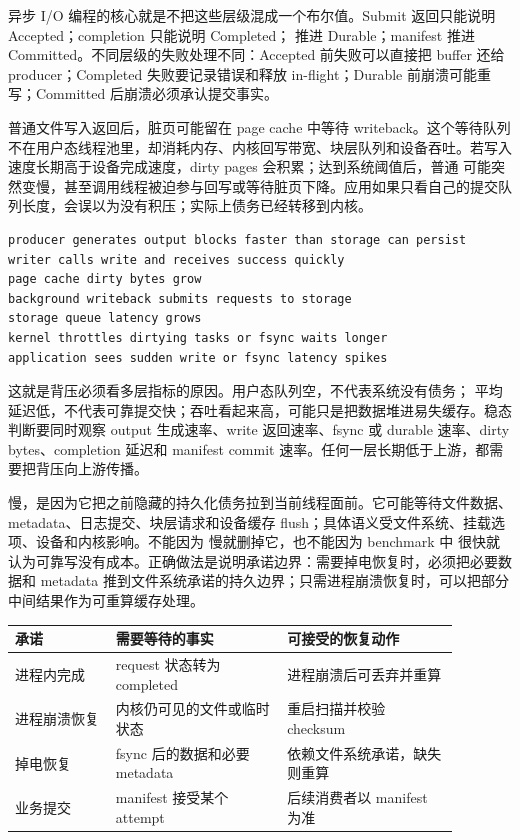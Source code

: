 异步 I/O 编程的核心就是不把这些层级混成一个布尔值。Submit 返回只能说明 Accepted；completion 只能说明 Completed； 推进 Durable；manifest 推进 Committed。不同层级的失败处理不同：Accepted 前失败可以直接把 buffer 还给 producer；Completed 失败要记录错误和释放 in-flight；Durable 前崩溃可能重写；Committed 后崩溃必须承认提交事实。

普通文件写入返回后，脏页可能留在 page cache 中等待 writeback。这个等待队列不在用户态线程池里，却消耗内存、内核回写带宽、块层队列和设备吞吐。若写入速度长期高于设备完成速度，dirty pages 会积累；达到系统阈值后，普通  可能突然变慢，甚至调用线程被迫参与回写或等待脏页下降。应用如果只看自己的提交队列长度，会误以为没有积压；实际上债务已经转移到内核。

\begin{lstlisting}[numbers=none,caption={写入债务从用户态转移到内核的过程}]
producer generates output blocks faster than storage can persist
writer calls write and receives success quickly
page cache dirty bytes grow
background writeback submits requests to storage
storage queue latency grows
kernel throttles dirtying tasks or fsync waits longer
application sees sudden write or fsync latency spikes
\end{lstlisting}

这就是背压必须看多层指标的原因。用户态队列空，不代表系统没有债务； 平均延迟低，不代表可靠提交快；吞吐看起来高，可能只是把数据堆进易失缓存。稳态判断要同时观察 output 生成速率、write 返回速率、fsync 或 durable 速率、dirty bytes、completion 延迟和 manifest commit 速率。任何一层长期低于上游，都需要把背压向上游传播。

 慢，是因为它把之前隐藏的持久化债务拉到当前线程面前。它可能等待文件数据、metadata、日志提交、块层请求和设备缓存 flush；具体语义受文件系统、挂载选项、设备和内核影响。不能因为  慢就删掉它，也不能因为 benchmark 中  很快就认为可靠写没有成本。正确做法是说明承诺边界：需要掉电恢复时，必须把必要数据和 metadata 推到文件系统承诺的持久边界；只需进程崩溃恢复时，可以把部分中间结果作为可重算缓存处理。

\begin{center}
\small
\begin{tabular}{@{}p{0.20\linewidth}p{0.34\linewidth}p{0.34\linewidth}@{}}
\toprule
承诺 & 需要等待的事实 & 可接受的恢复动作 \\
\midrule
进程内完成 & request 状态转为 completed & 进程崩溃后可丢弃并重算 \\
进程崩溃恢复 & 内核仍可见的文件或临时状态 & 重启扫描并校验 checksum \\
掉电恢复 & fsync 后的数据和必要 metadata & 依赖文件系统承诺，缺失则重算 \\
业务提交 & manifest 接受某个 attempt & 后续消费者以 manifest 为准 \\
\bottomrule
\end{tabular}
\end{center}


